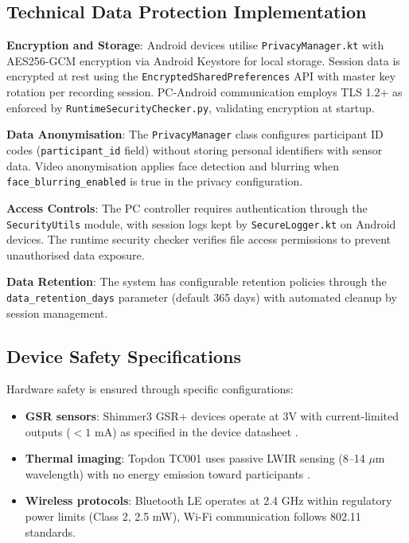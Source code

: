 \subsection{Technical Data Protection Implementation}

\textbf{Encryption and Storage}: Android devices utilise \texttt{PrivacyManager.kt} with AES256-GCM encryption via Android Keystore for local storage. Session data is encrypted at rest using the \texttt{EncryptedSharedPreferences} API with master key rotation per recording session. PC-Android communication employs TLS 1.2+ as enforced by \texttt{RuntimeSecurityChecker.py}, validating encryption at startup.

\textbf{Data Anonymisation}: The \texttt{PrivacyManager} class configures participant ID codes (\texttt{participant\_id} field) without storing personal identifiers with sensor data. Video anonymisation applies face detection and blurring when \texttt{face\_blurring\_enabled} is true in the privacy configuration.

\textbf{Access Controls}: The PC controller requires authentication through the \texttt{SecurityUtils} module, with session logs kept by \texttt{SecureLogger.kt} on Android devices. The runtime security checker verifies file access permissions to prevent unauthorised data exposure.

\textbf{Data Retention}: The system has configurable retention policies through the \texttt{data\_retention\_days} parameter (default 365 days) with automated cleanup by session management.

\subsection{Device Safety Specifications}
Hardware safety is ensured through specific configurations:
\begin{itemize}
    \item \textbf{GSR sensors}: Shimmer3 GSR+ devices operate at 3V with current-limited outputs ($<1$ mA) as specified in the device datasheet \cite{ref8}.
    \item \textbf{Thermal imaging}: Topdon TC001 uses passive LWIR sensing (8--14 $\mu$m wavelength) with no energy emission toward participants \cite{ref16}.
    \item \textbf{Wireless protocols}: Bluetooth LE operates at 2.4 GHz within regulatory power limits (Class 2, 2.5 mW), Wi-Fi communication follows 802.11 standards.
\end{itemize}
